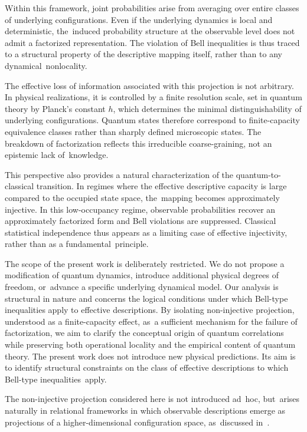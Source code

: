 \documentclass[11pt,a4paper]{article}
\theoremstyle{remark}
\begin{document}
    Within this framework, joint probabilities arise from averaging over entire classes of
    underlying configurations.
    Even if the underlying dynamics is local and deterministic, the~induced probability
    structure at the observable level does not admit a factorized representation.
    The violation of Bell inequalities is thus traced to a structural property of the
    descriptive mapping itself, rather than to any dynamical~nonlocality.

    The effective loss of information associated with this projection is not arbitrary.
    In physical realizations, it is controlled by a finite resolution scale, set in quantum
    theory by Planck's constant \(h\), which determines the minimal distinguishability of
    underlying configurations.
    Quantum states therefore correspond to finite-capacity equivalence classes rather than
    sharply defined microscopic states.
    The breakdown of factorization reflects this irreducible coarse-graining, not an
    epistemic lack of~knowledge.

    This perspective also provides a natural characterization of the quantum-to-classical
    transition.
    In regimes where the effective descriptive capacity is large compared to the occupied
    state space, the~mapping becomes approximately injective.
    In this low-occupancy regime, observable probabilities recover an approximately
    factorized form and Bell violations are suppressed.
    Classical statistical independence thus appears as a limiting case of effective
    injectivity, rather than as a fundamental~principle.

    The scope of the present work is deliberately restricted.
    We do not propose a modification of quantum dynamics, introduce additional physical
    degrees of freedom, or~advance a specific underlying dynamical model.
    Our analysis is structural in nature and concerns the logical conditions under which
    Bell-type inequalities apply to effective descriptions.
    By isolating non-injective projection, understood as a finite-capacity effect, as~a
    sufficient mechanism for the failure of factorization, we aim to clarify the conceptual
    origin of quantum correlations while preserving both operational locality and the
    empirical content of quantum theory.
    The present work does not introduce new physical predictions.
    Its aim is to identify structural constraints on the class of effective
    descriptions to which Bell-type inequalities~apply.

    The non-injective projection considered here is not introduced ad~hoc, but~arises
    naturally in relational frameworks in which observable descriptions emerge as
    projections of a higher-dimensional configuration space, as~discussed
    in~\cite{Beau2026a}.
\end{document}
